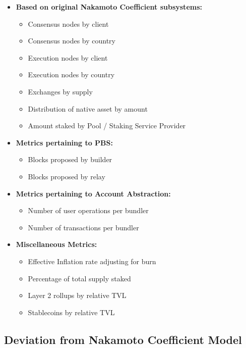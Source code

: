 \documentclass[conference]{IEEEtran}
\begin{document}
\begin{itemize}
   \item \textbf{Based on original Nakamoto Coefficient subsystems:}
   \begin{itemize}
     \item Consensus nodes by client
     \item Consensus nodes by country
     \item Execution nodes by client
     \item Execution nodes by country
     \item Exchanges by supply
     \item Distribution of native asset by amount
     \item Amount staked by Pool / Staking Service Provider
   \end{itemize}
   \item \textbf{Metrics pertaining to PBS:}
   \begin{itemize}
       \item Blocks proposed by builder
       \item Blocks proposed by relay
   \end{itemize}
   \item \textbf{Metrics pertaining to Account Abstraction:}
   \begin{itemize}
       \item Number of user operations per bundler
       \item Number of transactions per bundler
   \end{itemize}
   \item \textbf{Miscellaneous Metrics:}
   \begin{itemize}
       \item Effective Inflation rate adjusting for burn
       \item Percentage of total supply staked
       \item Layer 2 rollups by relative TVL
       \item Stablecoins by relative TVL
   \end{itemize}
 \end{itemize}

 \vspace{4pt}

\subsection{Deviation from Nakamoto Coefficient Model}
\end{document}
